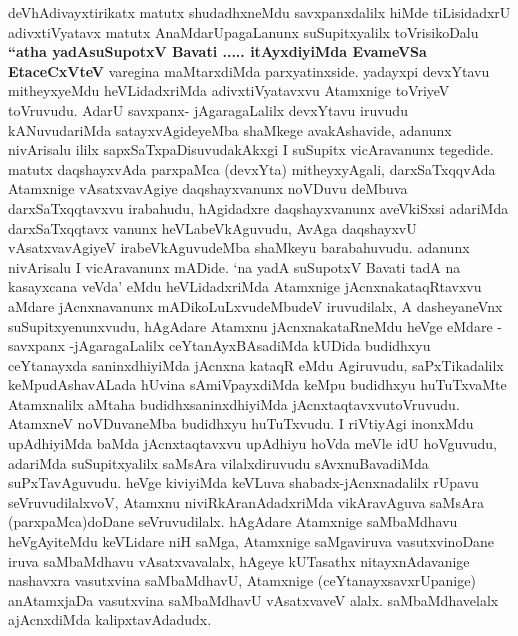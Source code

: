 \centerline{}

\begin{artha}
deVhAdivayxtirikatx matutx shudadhxneMdu savxpanxdalilx hiMde
tiLisidadxrU adivxtiVyatavx matutx AnaMdarUpagaLanunx
suSupitxyalilx toVrisikoDalu \textbf{``atha yadAsuSupotxV Bavati ..... itAyxdiyiMda EvameVSa EtaceCxVteV} varegina maMtarxdiMda parxyatinxside. yadayxpi devxYtavu mitheyxyeMdu heVLidadxriMda
adivxtiVyatavxvu Atamxnige toVriyeV toVruvudu. AdarU savxpanx-
jAgaragaLalilx devxYtavu iruvudu kANuvudariMda satayxvAgideyeMba
shaMkege avakAshavide, adanunx nivArisalu ililx
sapxSaTxpaDisuvudakAkxgi I suSupitx vicAravanunx tegedide. matutx
daqshayxvAda parxpaMca  (devxYta) mitheyxyAgali, darxSaTxqqvAda Atamxnige
vAsatxvavAgiye daqshayxvanunx noVDuvu deMbuva darxSaTxqqtavxvu
irabahudu, hAgidadxre daqshayxvanunx aveVkiSxsi adariMda
darxSaTxqqtavx	vanunx heVLabeVkAguvudu, AvAga daqshayxvU
vAsatxvavAgiyeV irabeVkAguvudeMba shaMkeyu barabahuvudu. adanunx
nivArisalu I vicAravanunx mADide. `na yadA suSupotxV Bavati tadA na kasayxcana veVda' eMdu heVLidadxriMda Atamxnige
jAcnxnakataqRtavxvu aMdare jAcnxnavanunx mADikoLuLxvudeMbudeV
iruvudilalx, A dasheyaneVnx suSupitxyenunxvudu, hAgAdare Atamxnu
jAcnxnakataRneMdu heVge eMdare - savxpanx -\break jAgaragaLalilx
ceYtanAyxBAsadiMda kUDida budidhxyu ceYtanayxda saninxdhiyiMda jAcnxna
kataqR eMdu Agiruvudu, saPxTikadalilx keMpudAshavALada hUvina
sAmiVpayxdiMda keMpu budidhxyu huTuTxvaMte Atamxnalilx aMtaha
budidhxsaninxdhiyiMda jAcnxtaqtavxvutoVruvudu. AtamxneV noVDuvaneMba
budidhxyu huTuTxvudu. I riVtiyAgi inonxMdu upAdhiyiMda baMda
jAcnxtaqtavxvu upAdhiyu hoVda meVle idU hoVguvudu, adariMda
suSupitxyalilx saMsAra vilalxdiruvudu sAvxnuBavadiMda
suPxTavAguvudu. heVge kiviyiMda keVLuva shabadx-jAcnxnadalilx rUpavu
seVruvudilalxvoV, Atamxnu niviRkAranAdadxriMda vikAravAguva saMsAra
(parxpaMca)doDane seVruvudilalx. hAgAdare Atamxnige saMbaMdhavu
heVgAyiteMdu keVLidare niH saMga, Atamxnige saMgaviruva
vasutxvinoDane iruva saMbaMdhavu vAsatxvavalalx, hAgeye kUTasathx
nitayxnAdavanige nashavxra vasutxvina saMbaMdhavU, Atamxnige
(ceYtanayxsavxrUpanige) anAtamxjaDa vasutxvina saMbaMdhavU
vAsatxvaveV alalx. saMbaMdhavelalx ajAcnxdiMda kalipxtavAdadudx.
\end{artha}


